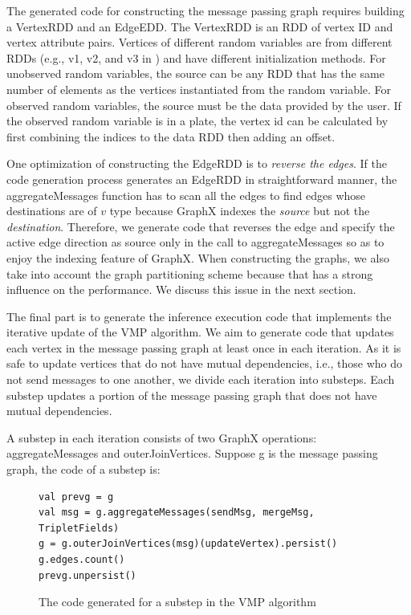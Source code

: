 The generated code for constructing  the message passing graph requires  building a VertexRDD
and an EdgeEDD. The VertexRDD is an RDD of vertex ID and vertex attribute pairs.
Vertices of different random variables
are from different RDDs (e.g., {\sf v1}, {\sf v2}, and {\sf v3} in )
and have different initialization methods.
For unobserved random variables, the source can be any RDD that has the same
number of elements as the vertices instantiated from the random variable. For
observed random variables, the source must be the data provided by the user. If
the observed random variable is in a plate, the vertex id can be
calculated by first combining the indices to the data RDD then adding an offset.

One optimization of constructing the EdgeRDD is to \emph{reverse the edges}.
If the code generation process generates an EdgeRDD in straightforward manner,
the {\sf aggregateMessages} function has to scan all the edges to find edges
whose destinations are of $v$ type because GraphX indexes the \emph{source}
but not the \emph{destination}.  Therefore, we generate code that reverses the
edge and specify the active edge direction as source only in the call to
{\sf aggregateMessages} so as to enjoy the indexing feature of GraphX.  When
constructing the graphs, we also take into account the graph partitioning
scheme because that has a strong influence on the performance.  We discuss
this issue in the next section.


The final part is to generate the inference execution code that implements the
iterative update of the VMP algorithm. 
We aim to generate code that updates each vertex in the
message passing graph at least once in each iteration. 
As it is safe to update vertices that do not
have mutual dependencies, i.e., those who do not send messages to one another,
we divide each iteration into substeps.
Each substep updates a portion of the
message passing graph that does not have mutual dependencies. 

A substep in each iteration consists of two GraphX operations:
{\sf aggregateMessages} and {\sf outerJoinVertices}. Suppose {\sf g} is the message passing
graph, the code of a substep is:

\begin{figure}[h]
\centering
\begin{lstlisting}
val prevg = g
val msg = g.aggregateMessages(sendMsg, mergeMsg, TripletFields)
g = g.outerJoinVertices(msg)(updateVertex).persist()
g.edges.count()
prevg.unpersist()
\end{lstlisting}
\caption{The code generated for a substep in the VMP algorithm}
\label{fig:code_substep}
\end{figure}

